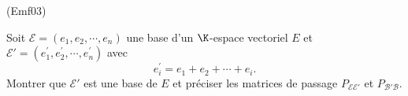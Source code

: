 \begin{tiny}(Emf03)\end{tiny}
Soit $\mathcal{E}=(e_{1},e_{2},\cdots ,e_{n})$ une base d'un $\K$-espace vectoriel $E$ et $\mathcal{E}'=(e_{1}^{\prime },e_{2}^{\prime},\cdots ,e_{n}^{\prime })$ avec 
\begin{displaymath}
e_{i}^{\prime }=e_{1}+e_{2}+\cdots + e_{i}. 
\end{displaymath}
Montrer que $\mathcal{E}'$ est une base de $E$ et pr{\'e}ciser les matrices de passage $P_{\mathcal{E}\mathcal{E}'}$ et $P_{\mathcal{B}'\mathcal{B}}$.
